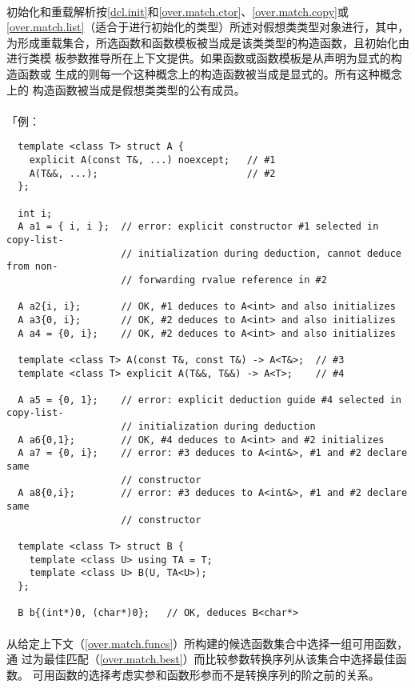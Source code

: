 \paragraph{}
初始化和重载解析按\ref{dcl.init}和\ref{over.match.ctor}、\ref{over.match.copy}或
\ref{over.match.list}（适合于进行初始化的类型）所述对假想类类型对象进行，其中，
为形成重载集合，所选函数和函数模板被当成是该类类型的构造函数，且初始化由进行类模
板参数推导所在上下文提供。如果函数或函数模板是从声明为显式的构造函数或
生成的则每一个这种概念上的构造函数被当成是显式的。所有这种概念上的
构造函数被当成是假想类类型的公有成员。

\paragraph{}
「例：
\begin{lstlisting}
  template <class T> struct A {
    explicit A(const T&, ...) noexcept;   // #1
    A(T&&, ...);                          // #2
  };

  int i;
  A a1 = { i, i };  // error: explicit constructor #1 selected in copy-list-
                    // initialization during deduction, cannot deduce from non-
                    // forwarding rvalue reference in #2

  A a2{i, i};       // OK, #1 deduces to A<int> and also initializes
  A a3{0, i};       // OK, #2 deduces to A<int> and also initializes
  A a4 = {0, i};    // OK, #2 deduces to A<int> and also initializes

  template <class T> A(const T&, const T&) -> A<T&>;  // #3
  template <class T> explicit A(T&&, T&&) -> A<T>;    // #4

  A a5 = {0, 1};    // error: explicit deduction guide #4 selected in copy-list-
                    // initialization during deduction
  A a6{0,1};        // OK, #4 deduces to A<int> and #2 initializes
  A a7 = {0, i};    // error: #3 deduces to A<int&>, #1 and #2 declare same
                    // constructor
  A a8{0,i};        // error: #3 deduces to A<int&>, #1 and #2 declare same
                    // constructor

  template <class T> struct B {
    template <class U> using TA = T;
    template <class U> B(U, TA<U>);
  };

  B b{(int*)0, (char*)0};   // OK, deduces B<char*>
\end{lstlisting}

\paragraph{}
从给定上下文（\ref{over.match.funcs}）所构建的候选函数集合中选择一组可用函数，通
过为最佳匹配（\ref{over.match.best}）而比较参数转换序列从该集合中选择最佳函数。
可用函数的选择考虑实参和函数形参而不是转换序列的阶之前的关系。

